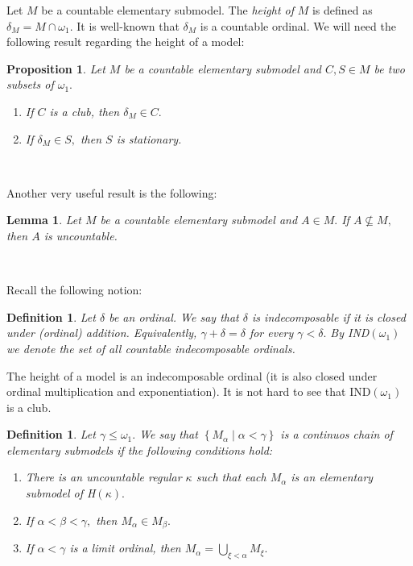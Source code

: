 \documentclass{article}
\newtheorem{definition}[theorem]{Definition}
\newtheorem{lemma}[theorem]{Lemma}
\newtheorem{proposition}[theorem]{Proposition}
\begin{document}
\qquad\qquad\qquad\qquad

Let $M$ be a countable elementary submodel. The \emph{height of }$M$ is
defined as $\delta_{M}=M\cap\omega_{1}.$ It is well-known that $\delta_{M}$ is
a countable ordinal. We will need the following result regarding the height of
a model:

\begin{proposition}
Let $M$ be a countable elementary submodel and $C,S\in M$ be two subsets of
$\omega_{1}.$ \label{Prop submodelos club y est}

\begin{enumerate}
\item If $C$ is a club, then $\delta_{M}\in C.$

\item If $\delta_{M}\in S,$ then $S$ is stationary.
\end{enumerate}
\end{proposition}

\qquad\ \qquad\ \qquad\ 

Another very useful result is the following:

\begin{lemma}
Let $M$ be a countable elementary submodel and $A\in M.$ If $A\nsubseteq M,$
then $A$ is uncountable. \label{Lema modelo contension}
\end{lemma}

\qquad\ \qquad\ \ 

Recall the following notion:

\begin{definition}
Let $\delta$ be an ordinal. We say that $\delta$ is \emph{indecomposable }if
it is closed under (ordinal) addition. Equivalently, $\gamma+\delta=\delta$
for every $\gamma<\delta.$ By \textsf{IND}$\left(  \omega_{1}\right)  $ we
denote the set of all countable indecomposable ordinals.
\end{definition}

\qquad\qquad\qquad

The height of a model is an indecomposable ordinal (it is also closed under
ordinal multiplication and exponentiation). It is not hard to see that
\textsf{IND}$\left(  \omega_{1}\right)  $ is a club.

\begin{definition}
Let $\gamma\leq\omega_{1}.$ We say that $\left\{  M_{\alpha}\mid\alpha
<\gamma\right\}  $ is a \emph{continuos chain of elementary submodels} if the
following conditions hold:

\begin{enumerate}
\item There is an uncountable regular $\kappa$ such that each $M_{\alpha}$ is
an elementary submodel of \textsf{H}$\left(  \kappa\right)  .$

\item If $\alpha<\beta<\gamma,$ then $M_{\alpha}\in M_{\beta}.$

\item If $\alpha<\gamma$ is a limit ordinal, then $M_{\alpha}=\bigcup
\limits_{\xi<\alpha}M_{\xi}.$
\end{enumerate}
\end{definition}
\end{document}
